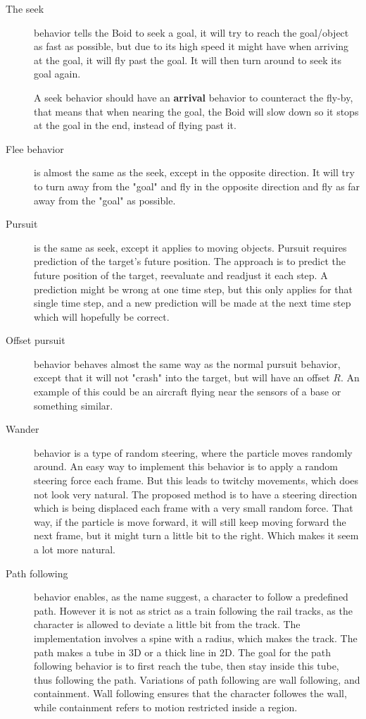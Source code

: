 \begin{description}
\label{boids:behaviors}
\item[The seek]behavior tells the Boid to seek a goal, it will try to reach the goal/object as fast as possible, but due to its high speed it might have when arriving at the goal, it will fly past the goal. It will then turn around to seek its goal again.

A seek behavior should have an \textbf{arrival} behavior to counteract the fly-by, that means that when nearing the goal, the Boid will slow down so it stops at the goal in the end, instead of flying past it.

\item [Flee behavior] is almost the same as the seek, except in the opposite direction. It will try to turn away from the "goal" and fly in the opposite direction and fly as far away from the "goal" as possible.

\item [Pursuit] is the same as seek, except it applies to moving objects. Pursuit requires prediction of the target's future position. The approach is to predict the future position of the target, reevaluate and readjust it each step. A prediction might be wrong at one time step, but this only applies for that single time step, and a new prediction will be made at the next time step which will hopefully be correct.

\item [Offset pursuit] behavior behaves almost the same way as the normal pursuit behavior, except that it will not "crash" into the target, but will have an offset $R$. An example of this could be an aircraft flying near the sensors of a base or something similar. 

\item [Wander] behavior is a type of random steering, where the particle moves randomly around. An easy way to implement this behavior is to apply a random steering force each frame. But this leads to twitchy movements, which does not look very natural. The proposed method is to have a steering direction which is being displaced each frame with a very small random force.
That way, if the particle is move forward, it will still keep moving forward the next frame, but it might turn a little bit to the right. Which makes it seem a lot more natural.

\item [Path following] behavior enables, as the name suggest, a character to follow a predefined path. However it is not as strict as a train following the rail tracks, as the character is allowed to deviate a little bit from the track. The implementation involves a spine with a radius, which makes the track. The path makes a tube in 3D or a thick line in 2D. The goal for the path following behavior is to first reach the tube, then stay inside this tube, thus following the path. Variations of path following are wall following, and containment. Wall following ensures that the character followes the wall, while containment refers to motion restricted inside a region.


\end{description}
